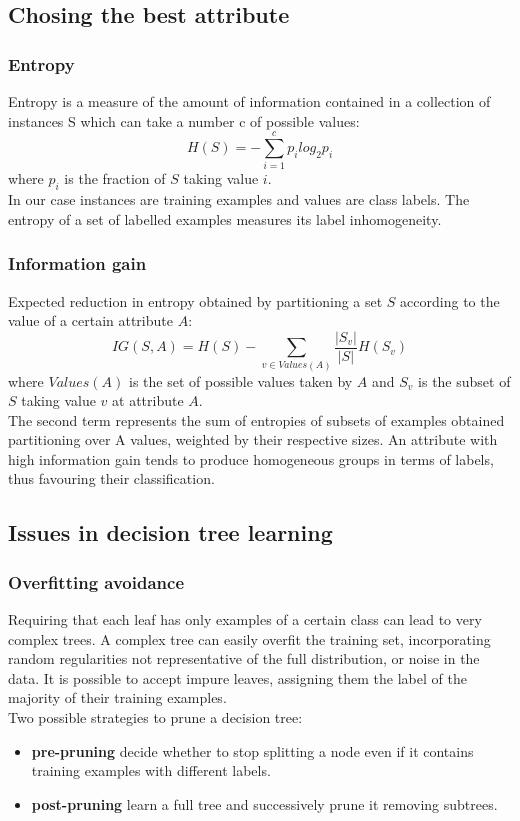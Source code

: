 \documentclass[a4paper, 10pt, titlepage]{article}
\begin{document}
\subsection{Chosing the best attribute}
\subsubsection{Entropy}
Entropy is a measure of the amount of information contained in a collection of instances S which can take a number c of possible values:
$$H(S) = - \sum_{i=1}^{c}{p_i log_2p_i}$$
where $p_i$ is the fraction of $S$ taking value $i$. \\
In our case instances are training examples and values are class labels. The entropy of a set of labelled examples measures its label inhomogeneity.

\subsubsection{Information gain}
Expected reduction in entropy obtained by partitioning a set $S$ according to the value of a certain attribute $A$:
$$IG(S,A) = H(S) - \sum_{v \in Values(A)} \dfrac{|S_v|}{|S|}H(S_v)$$
where $Values(A)$ is the set of possible values taken by $A$ and $S_v$ is the subset of $S$ taking value $v$ at attribute $A$. \\
The second term represents the sum of entropies of subsets of examples obtained partitioning over A values, weighted by their respective sizes. An attribute with high information gain tends to produce homogeneous groups in terms of labels, thus favouring their classification.

\subsection{Issues in decision tree learning}
\subsubsection{Overfitting avoidance}
Requiring that each leaf has only examples of a certain class can lead to very complex trees. A complex tree can easily overfit the training set, incorporating random regularities not representative of the full distribution, or noise in the data. It is possible to accept impure leaves, assigning them the label of the majority of their training examples. \\
Two possible strategies to prune a decision tree:
\begin{itemize}
\item \textbf{pre-pruning} decide whether to stop splitting a node even if it contains training examples with different labels.
\item \textbf{post-pruning} learn a full tree and successively prune it removing subtrees.
\end{itemize}
\end{document}

